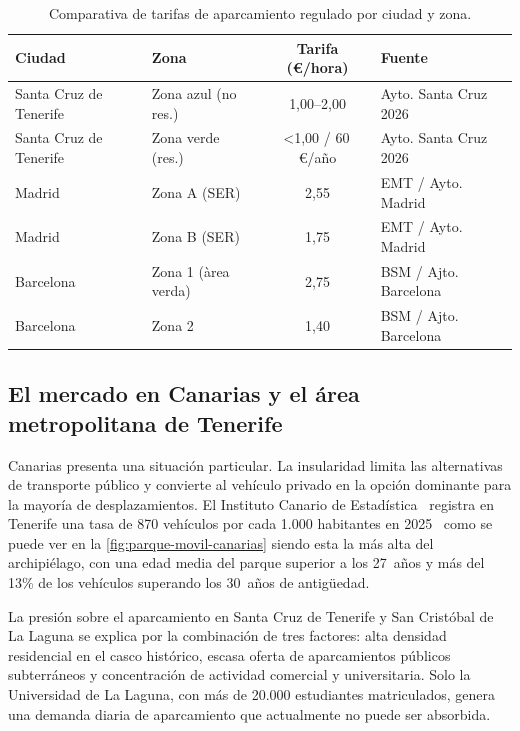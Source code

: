 \begin{table}[H]
  \centering
  \caption{Comparativa de tarifas de aparcamiento regulado por ciudad y zona.}
  \label{tab:tarifas-regulado}
  \begin{tabularx}{\textwidth}{X X c X}
    \toprule
    \textbf{Ciudad}        & \textbf{Zona}       & \textbf{Tarifa (€/hora)} & \textbf{Fuente}       \\
    \midrule
    Santa Cruz de Tenerife & Zona azul (no res.) & 1,00--2,00               & Ayto. Santa Cruz 2026 \\
    Santa Cruz de Tenerife & Zona verde (res.)   & <1,00 / 60\,€/año        & Ayto. Santa Cruz 2026 \\
    Madrid                 & Zona A (SER)        & 2,55                     & EMT / Ayto. Madrid    \\
    Madrid                 & Zona B (SER)        & 1,75                     & EMT / Ayto. Madrid    \\
    Barcelona              & Zona 1 (àrea verda) & 2,75                     & BSM / Ajto. Barcelona \\
    Barcelona              & Zona 2              & 1,40                     & BSM / Ajto. Barcelona \\
    \bottomrule
  \end{tabularx}
\end{table}

\subsection{El mercado en Canarias y el área metropolitana de Tenerife}

Canarias presenta una situación particular. La insularidad limita las alternativas de transporte público y convierte al vehículo privado en la opción dominante para la mayoría de desplazamientos. El Instituto Canario de Estadística~\cite{istac2024} registra en Tenerife una tasa de 870 vehículos por cada 1.000 habitantes en 2025~\cite{eldia2025motoriz} como se puede ver en la \autoref{fig:parque-movil-canarias} siendo esta la más alta del archipiélago, con una edad media del parque superior a los 27~años y más del 13\% de los vehículos superando los 30~años de antigüedad.

La presión sobre el aparcamiento en Santa Cruz de Tenerife y San Cristóbal de La Laguna se explica por la combinación de tres factores: alta densidad residencial en el casco histórico, escasa oferta de aparcamientos públicos subterráneos y concentración de actividad comercial y universitaria. Solo la Universidad de La Laguna, con más de 20.000 estudiantes matriculados, genera una demanda diaria de aparcamiento que actualmente no puede ser absorbida.

